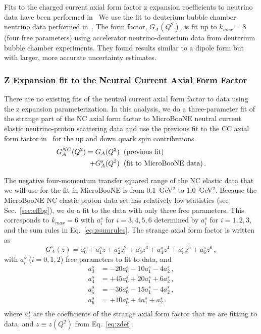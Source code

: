   Fits to the charged current axial form factor z expansion coefficients to
  neutrino data have been performed
  in~\cite{Bhattacharya:2011ah,Bhattacharya:2015mpa,Meyer:2016oeg} We use the
  fit to deuterium bubble chamber neutrino data performed
  in~\cite{Meyer:2016oeg}. The form factor, $G_A(Q^2)$, is fit up to $k_{max} =
  8$ (four free parameters) using accelerator neutrino-deuterium data from
  deuterium bubble chamber experiments. They found results similar to a dipole
  form but with larger, more accurate uncertainty estimates.


  \subsubsection{Z Expansion fit to the Neutral Current Axial Form Factor}

  There are no existing fits of the neutral current axial form factor to data
  using the z expansion parameterization. In this analysis, we do a
  three-parameter fit of the strange part of the NC axial form factor to
  MicroBooNE neutral current elastic neutrino-proton scattering data and use
  the previous fit to the CC axial form factor in~\cite{Meyer:2016oeg} for the
  up and down quark spin contributions.
  \begin{align*}
    G_A^{NC}(Q^2) = G_A(Q^2) \hspace{2mm} &(\textrm{previous fit}) \\
                + G_A^s(Q^2) \hspace{2mm} &(\textrm{fit to MicroBooNE data}) \,.
  \end{align*}

  The negative four-momentum transfer squared range of the NC elastic data that
  we will use for the fit in MicroBooNE is from $0.1$~GeV$^2$ to $1.0$~GeV$^2$.
  Because the MicroBooNE NC elastic proton data set has relatively low
  statistics (see Sec.~\ref{sec:effbg}), we do a fit to the data with only
  three free parameters. This corresponds to $k_{max} = 6$ with $a_i^s$ for
  $i=3,4,5,6$ determined by $a_i^s$ for $i=1,2,3$, and the sum rules in
  Eq.~\ref{eq:zsumrules}. The strange axial form factor is written as
  \begin{equation}
    G_A^s(z) = a_0^s + a_1^s z + a_2^s z^2 
      + a_3^s z^3 + a_4^s z^4 + a_5^s z^5 + a_6^s z^6 \,,
  \end{equation}
  with $a_i^s$ ($i=0,1,2$) free parameters to fit to data, and
  \begin{align*}
    a_3^s &= - 20 a_0^s - 10 a_1^s - 4 a_2^s \,,\\
    a_4^s &= + 45 a_0^s + 20 a_1^s + 6 a_2^s \,, \\
    a_5^s &= - 36 a_0^s - 15 a_1^s - 4 a_2^s \,, \\
    a_6^s &= + 10 a_0^s + 4 a_1^s + a_2^s \,. \\
  \end{align*}
  where $a_i^s$ are the coefficients of the strange axial form factor that we
  are fitting to data, and $z \equiv z(Q^2)$ from Eq.~\ref{eq:zdef}.


